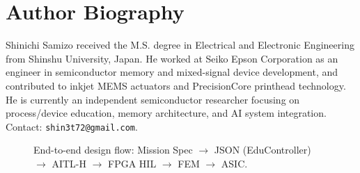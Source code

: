 \documentclass[conference]{IEEEtran}
\begin{document}
\section*{Author Biography}
\begingroup\small
Shinichi Samizo received the M.S. degree in Electrical and Electronic Engineering from Shinshu University, Japan. He worked at Seiko Epson Corporation as an engineer in semiconductor memory and mixed-signal device development, and contributed to inkjet MEMS actuators and PrecisionCore printhead technology. He is currently an independent semiconductor researcher focusing on process/device education, memory architecture, and AI system integration. Contact: \texttt{shin3t72@gmail.com}.
\endgroup


\FloatBarrier

\begin{figure}[!b]
\centering
{}
\caption{End-to-end design flow: Mission Spec $\rightarrow$ JSON (EduController) $\rightarrow$ AITL-H $\rightarrow$ FPGA HIL $\rightarrow$ FEM $\rightarrow$ ASIC.}
\label{fig:flow}
\end{figure}
\end{document}
